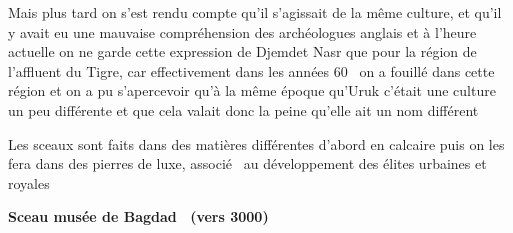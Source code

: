 \documentclass[a4paper]{article}
\begin{document}
{
Mais plus tard on s'est rendu compte qu'il s'agissait de la même culture, et qu'il y avait eu une mauvaise compréhension
des archéologues anglais et à l'heure actuelle on ne garde cette expression de Djemdet Nasr que pour la région de
l'affluent du Tigre, car effectivement dans les années 60 \ on a fouillé dans cette région et on a pu s'apercevoir qu'à
la même époque qu'Uruk c'était une culture un peu différente et que cela valait donc la peine qu'elle ait un nom
différent}


\bigskip

{
Les sceaux sont faits dans des matières différentes d'abord en calcaire puis on les fera dans des pierres de luxe,
associé \ au développement des élites urbaines et royales}


\bigskip


\bigskip


\bigskip


\bigskip


\bigskip


\bigskip


\bigskip


\bigskip


\bigskip


\bigskip


\bigskip


\bigskip


\bigskip


\bigskip


\bigskip


\bigskip


\bigskip


\bigskip


\bigskip


\bigskip


\bigskip


\bigskip


\bigskip


\bigskip


\bigskip


\bigskip


\bigskip


\bigskip

{
\textbf{Sceau musée de Bagdad \ (vers 3000)}}


\bigskip


\bigskip


\bigskip


\bigskip


\bigskip
\end{document}
